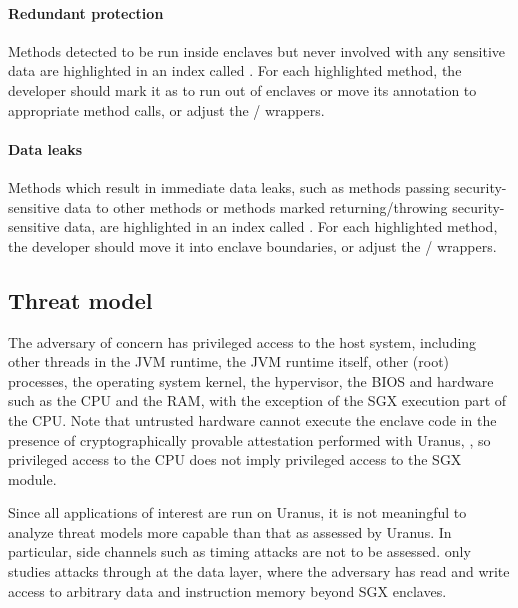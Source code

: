 \paragraph{Redundant protection}
Methods detected to be run inside enclaves but never involved with any sensitive data
are highlighted in an index called .
For each highlighted method, the developer
should mark it as  to run out of enclaves
or move its  annotation to appropriate method calls,
or adjust the / wrappers.

\paragraph{Data leaks}
Methods which result in immediate data leaks,
such as methods passing security-sensitive data to other  methods
or methods marked  returning/throwing security-sensitive data,
are highlighted in an index called .
For each highlighted method, the developer
should move it into enclave boundaries,
or adjust the / wrappers.

\subsection{Threat model}
The adversary of concern has privileged access to the host system,
including other threads in the JVM runtime, the JVM runtime itself,
other (root) processes, the operating system kernel,
the hypervisor, the BIOS and hardware such as the CPU and the RAM,
with the exception of the SGX execution part of the CPU.
Note that untrusted hardware cannot execute the enclave code
in the presence of cryptographically provable attestation performed with Uranus,
\cite{uranus},
so privileged access to the CPU does not imply privileged access to the SGX module.

Since all applications of interest are run on Uranus,
it is not meaningful to analyze threat models more capable than that as assessed by Uranus.
In particular, side channels such as timing attacks are not to be assessed.
\pname{} only studies attacks through at the data layer,
where the adversary has read and write access
to arbitrary data and instruction memory beyond SGX enclaves.

